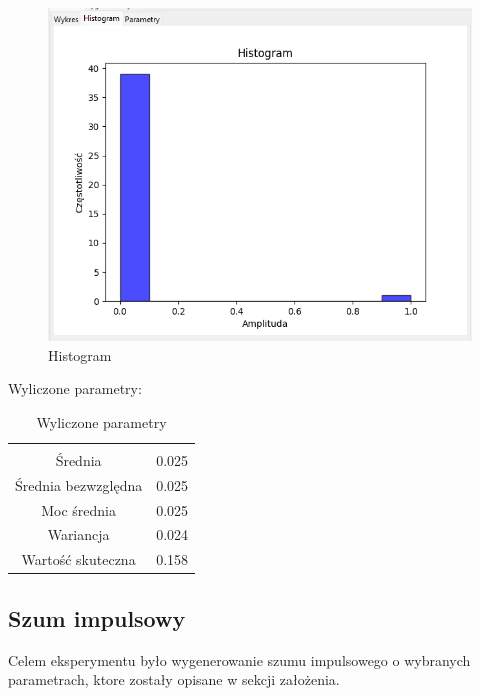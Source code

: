 \documentclass{article}
\begin{document}
\begin{figure}[h!]
    \centering
    \includegraphics[width=\textwidth]{img/impuls/hist.png}
    \caption{Histogram}
\end{figure}
\FloatBarrier
Wyliczone parametry:
\begin{table}[h!]
    \centering
    \vspace{0.2cm}
    \begin{tabular}{|c|c|}
        \hline\hline\\[-0.4cm]
        Średnia & 0.025  \\
        \hline
        Średnia bezwzględna & 0.025  \\
        \hline
        Moc średnia & 0.025  \\
        \hline
        Wariancja & 0.024 \\
        \hline
        Wartość skuteczna & 0.158 \\
        \hline
    \end{tabular}
    \caption{Wyliczone parametry}
    \label{impuls}
\end{table}  

\subsection{Szum impulsowy} \label{szumimpuls} 
Celem eksperymentu było wygenerowanie szumu impulsowego o wybranych parametrach,
ktore zostały opisane w sekcji założenia.
\end{document}
